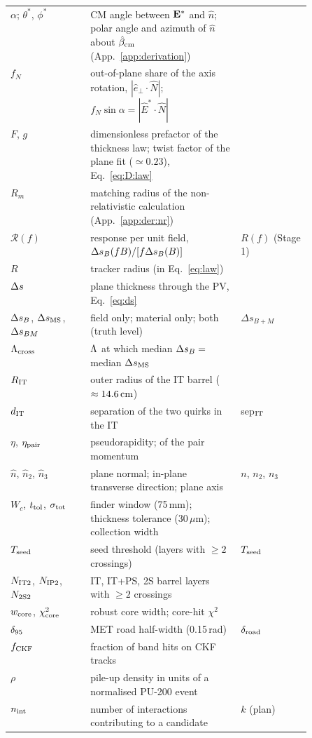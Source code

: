 \begin{center}
\begin{longtable}{l>{\raggedright\arraybackslash}p{0.50\linewidth}l}
$\alpha$; $\theta^*$, $\phi^*$ & CM angle between $\mathbf{E}^*$ and $\hat n$; polar angle and azimuth of $\hat n$ about $\hat\beta_{\rm cm}$ (App.~\ref{app:derivation}) & \\
$f_N$ & out-of-plane share of the axis rotation, $|\hat e_\perp\cdot\hat N|$; $f_N\sin\alpha=|\hat E^*\cdot\hat N|$ & \\
$F$, $g$ & dimensionless prefactor of the thickness law; twist factor of the plane fit ($\simeq0.23$), Eq.~\eqref{eq:D:law} & \\
$R_m$ & matching radius of the non-relativistic calculation (App.~\ref{app:der:nr}) & \\
$\mathcal R(f)$ & response per unit field, $\Delta s_B(fB)/[f\Delta s_B(B)]$ & $R(f)$ (Stage 1)\\
$R$ & tracker radius (in Eq.~\eqref{eq:law}) & \\
$\Delta s$ & plane thickness through the PV, Eq.~\eqref{eq:ds} & \\
$\Delta s_B$, $\Delta s_{\rm MS}$, $\Delta s_{BM}$ & field only; material only; both (truth level) & $\Delta s_{B+M}$\\
$\Lambda_{\rm cross}$ & $\Lambda$ at which median $\Delta s_B=$ median $\Delta s_{\rm MS}$ & \\
$R_{\rm IT}$ & outer radius of the IT barrel ($\approx14.6\,\mathrm{cm}$) & \\
$d_{\rm IT}$ & separation of the two quirks in the IT & sep$_{\rm IT}$\\
$\eta$, $\eta_{\rm pair}$ & pseudorapidity; of the pair momentum & \\
$\hat n$, $\hat n_2$, $\hat n_3$ & plane normal; in-plane transverse direction; plane axis & $n$, $n_2$, $n_3$\\
$W_c$, $t_{\rm tol}$, $\sigma_{\rm tot}$ & finder window (75\,mm); thickness tolerance (30\,$\mu$m); collection width & \\
$T_{\rm seed}$ & seed threshold (layers with $\ge2$ crossings) & $T_{\rm seed}$\\
$N_{\rm IT2}$, $N_{\rm IP2}$, $N_{\rm 2S2}$ & IT, IT+PS, 2S barrel layers with $\ge2$ crossings & \\
$w_{\rm core}$, $\chi^2_{\rm core}$ & robust core width; core-hit $\chi^2$ & \\
$\delta_{95}$ & MET road half-width (0.15\,rad) & $\delta_{\rm road}$\\
$f_{\rm CKF}$ & fraction of band hits on CKF tracks & \\
$\rho$ & pile-up density in units of a normalised PU-200 event & \\
$n_{\rm int}$ & number of interactions contributing to a candidate & $k$ (plan)\\

\end{longtable}
\end{center}
